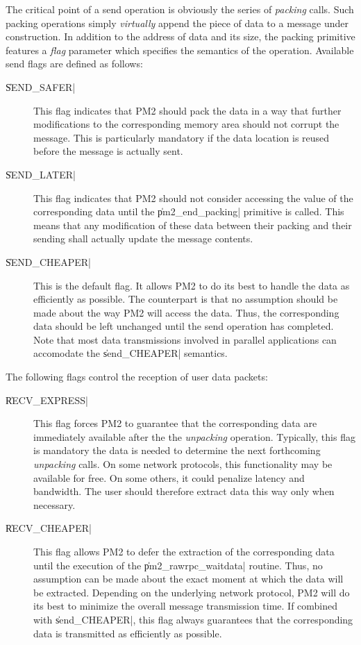 The critical point of a send operation is obviously the series of
\emph{packing} calls. Such packing operations simply \emph{virtually}
append the piece of data to a message under construction. In addition
to the address of data and its size, the packing primitive features a
\emph{flag} parameter which specifies the semantics of the operation.
Available send flags are defined as follows:
\begin{description}
    
\item[\|SEND_SAFER|] This flag indicates that PM2 should pack the data
  in a way that further modifications to the corresponding memory area
  should not corrupt the message. This is particularly mandatory if
  the data location is reused before the message is actually sent.
  
\item[\|SEND_LATER|] This flag indicates that PM2 should not consider
  accessing the value of the corresponding data until the
  \|pm2_end_packing| primitive is called. This means that any
  modification of these data between their packing and their sending
  shall actually update the message contents.
    
\item[\|SEND_CHEAPER|] This is the default flag. It allows PM2 to do
  its best to handle the data as efficiently as possible. The
  counterpart is that no assumption should be made about the way PM2
  will access the data. Thus, the corresponding data should be left
  unchanged until the send operation has completed. Note that most
  data transmissions involved in parallel applications can accomodate
  the \|send_CHEAPER| semantics.

\end{description}
The following flags control the reception of user data packets:
\begin{description}
    
\item[\|RECV_EXPRESS|] This flag forces PM2 to guarantee that the
  corresponding data are immediately available after the the
  \emph{unpacking} operation. Typically, this flag is mandatory the
  data is needed to determine the next forthcoming \emph{unpacking}
  calls.  On some network protocols, this functionality may be
  available for free. On some others, it could penalize latency and
  bandwidth. The user should therefore extract data this way only when
  necessary.
    
\item[\|RECV_CHEAPER|] This flag allows PM2 to defer the extraction of
  the corresponding data until the execution of the
  \|pm2_rawrpc_waitdata| routine.  Thus, no assumption can be made
  about the exact moment at which the data will be extracted.
  Depending on the underlying network protocol, PM2 will do its best
  to minimize the overall message transmission time. If combined with
  \|send_CHEAPER|, this flag always guarantees that the corresponding
  data is transmitted as efficiently as possible.

\end{description}
